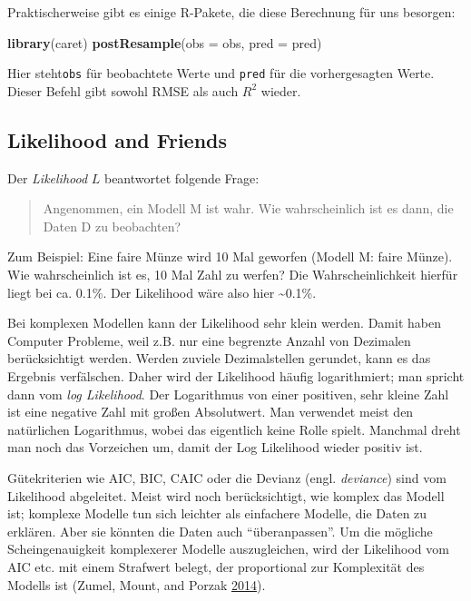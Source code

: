 \documentclass[12pt,]{book}
\newenvironment{Shaded}{\begin{snugshade}}{\end{snugshade}}
\newcommand{\KeywordTok}[1]{\textcolor[rgb]{0.13,0.29,0.53}{\textbf{{#1}}}}
\newcommand{\DataTypeTok}[1]{\textcolor[rgb]{0.13,0.29,0.53}{{#1}}}
\newcommand{\NormalTok}[1]{{#1}}
\begin{document}
Praktischerweise gibt es einige R-Pakete, die diese Berechnung für uns
besorgen:

\begin{Shaded}
\begin{Highlighting}[]
\KeywordTok{library}\NormalTok{(caret)}
\KeywordTok{postResample}\NormalTok{(}\DataTypeTok{obs =} \NormalTok{obs, }\DataTypeTok{pred =} \NormalTok{pred)}
\end{Highlighting}
\end{Shaded}

Hier steht\texttt{obs} für beobachtete Werte und \texttt{pred} für die
vorhergesagten Werte. Dieser Befehl gibt sowohl RMSE als auch \(R^2\)
wieder.

\subsection{Likelihood and Friends}\label{likelihood-and-friends}

Der \emph{Likelihood} \(L\) beantwortet folgende Frage:

\begin{quote}
Angenommen, ein Modell M ist wahr. Wie wahrscheinlich ist es dann, die
Daten D zu beobachten?
\end{quote}

Zum Beispiel: Eine faire Münze wird 10 Mal geworfen (Modell M: faire
Münze). Wie wahrscheinlich ist es, 10 Mal Zahl zu werfen? Die
Wahrscheinlichkeit hierfür liegt bei ca. 0.1\%. Der Likelihood wäre also
hier \textasciitilde{}0.1\%.

Bei komplexen Modellen kann der Likelihood sehr klein werden. Damit
haben Computer Probleme, weil z.B. nur eine begrenzte Anzahl von
Dezimalen berücksichtigt werden. Werden zuviele Dezimalstellen gerundet,
kann es das Ergebnis verfälschen. Daher wird der Likelihood häufig
logarithmiert; man spricht dann vom \emph{log Likelihood}. Der
Logarithmus von einer positiven, sehr kleine Zahl ist eine negative Zahl
mit großen Absolutwert. Man verwendet meist den natürlichen Logarithmus,
wobei das eigentlich keine Rolle spielt. Manchmal dreht man noch das
Vorzeichen um, damit der Log Likelihood wieder positiv ist.

Gütekriterien wie AIC, BIC, CAIC oder die Devianz (engl.
\emph{deviance}) sind vom Likelihood abgeleitet. Meist wird noch
berücksichtigt, wie komplex das Modell ist; komplexe Modelle tun sich
leichter als einfachere Modelle, die Daten zu erklären. Aber sie könnten
die Daten auch ``überanpassen''. Um die mögliche Scheingenauigkeit
komplexerer Modelle auszugleichen, wird der Likelihood vom AIC etc. mit
einem Strafwert belegt, der proportional zur Komplexität des Modells ist
(Zumel, Mount, and Porzak
\protect\hyperlink{ref-zumel2014practical}{2014}).
\end{document}
